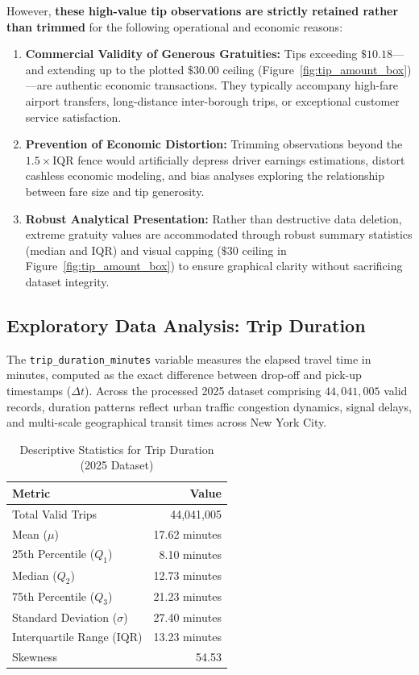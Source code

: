\documentclass[11pt,a4paper]{article}
\begin{document}
However, \textbf{these high-value tip observations are strictly retained rather than trimmed} for the following operational and economic reasons:
\begin{enumerate}
    \item \textbf{Commercial Validity of Generous Gratuities:} Tips exceeding $\$10.18$—and extending up to the plotted $\$30.00$ ceiling (Figure~\ref{fig:tip_amount_box})—are authentic economic transactions. They typically accompany high-fare airport transfers, long-distance inter-borough trips, or exceptional customer service satisfaction.
    \item \textbf{Prevention of Economic Distortion:} Trimming observations beyond the $1.5 \times \text{IQR}$ fence would artificially depress driver earnings estimations, distort cashless economic modeling, and bias analyses exploring the relationship between fare size and tip generosity.
    \item \textbf{Robust Analytical Presentation:} Rather than destructive data deletion, extreme gratuity values are accommodated through robust summary statistics (median and IQR) and visual capping ($\$30$ ceiling in Figure~\ref{fig:tip_amount_box}) to ensure graphical clarity without sacrificing dataset integrity.
\end{enumerate}

\subsection{Exploratory Data Analysis: Trip Duration}
\label{sec:eda_trip_duration}

The \texttt{trip\_duration\_minutes} variable measures the elapsed travel time in minutes, computed as the exact difference between drop-off and pick-up timestamps ($\Delta t$). Across the processed 2025 dataset comprising $44,041,005$ valid records, duration patterns reflect urban traffic congestion dynamics, signal delays, and multi-scale geographical transit times across New York City.

\begin{table}[htbp]
\centering
\caption{Descriptive Statistics for Trip Duration (2025 Dataset)}
\label{tab:stats_trip_duration}
\begin{tabular}{lr}
\toprule
\textbf{Metric} & \textbf{Value} \\
\midrule
Total Valid Trips & 44,041,005  \\
Mean ($\mu$) & 17.62 minutes \\
25th Percentile ($Q_1$) & 8.10 minutes \\
Median ($Q_2$) & 12.73 minutes \\
75th Percentile ($Q_3$) & 21.23 minutes \\
Standard Deviation ($\sigma$) & 27.40 minutes \\
Interquartile Range (IQR) & 13.23 minutes \\
Skewness & 54.53 \\
\bottomrule
\end{tabular}
\end{table}
\end{document}
